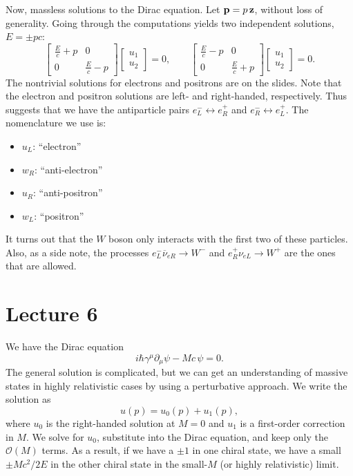 \documentclass[../p164main.tex]{subfiles}
\begin{document}
Now, massless solutions to the Dirac equation.
Let $\mathbf{p} = p \,\mathbf{z}$, without loss of generality.
Going through the computations yields two independent solutions, $E = \pm pc$:
\[ \begin{bmatrix} \frac{E}{c} + p & 0 \\ 0 & \frac{E}{c} - p \end{bmatrix} \begin{bmatrix} u_1 \\ u_2 \end{bmatrix} = 0, \qquad \begin{bmatrix} \frac{E}{c} - p & 0 \\ 0 & \frac{E}{c} + p \end{bmatrix} \begin{bmatrix} u_1 \\ u_2 \end{bmatrix} = 0. \]
The nontrivial solutions for electrons and positrons are on the slides.
Note that the electron and positron solutions are left- and right-handed, respectively.
Thus suggests that we have the antiparticle pairs $e_L^- \leftrightarrow e_R^+$ and $e_R^- \leftrightarrow e_L^+$.
The nomenclature we use is:
\begin{itemize}[topsep=0pt]
    \item $u_L$: ``electron''
    \item $w_R$: ``anti-electron''
    \item $u_R$: ``anti-positron''
    \item $w_L$: ``positron''
\end{itemize}
It turns out that the $W$ boson only interacts with the first two of these particles.
Also, as a side note, the processes $e_L^- \overline{\nu}_{eR} \to W^-$ and $e_R^+ \nu_{eL} \to W^+$ are the ones that are allowed.

\section{Lecture 6}
We have the Dirac equation
\[ i\hbar \gamma^\mu \partial_\mu \psi - Mc \,\psi = 0. \]
The general solution is complicated, but we can get an understanding of massive states in highly relativistic cases by using a perturbative approach.
We write the solution as
\[ u(p) = u_0(p) + u_1(p), \]
where $u_0$ is the right-handed solution at $M = 0$ and $u_1$ is a first-order correction in $M$.
We solve for $u_0$, substitute into the Dirac equation, and keep only the $\mathcal O(M)$ terms.
As a result, if we have a $\pm 1$ in one chiral state, we have a small $ \pm Mc^2 / 2E$ in the other chiral state in the small-$M$ (or highly relativistic) limit.
\end{document}

